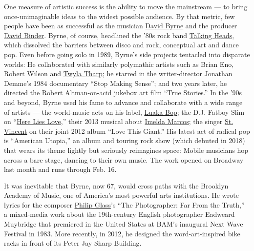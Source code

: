 One measure of artistic success is the ability to move the mainstream
--- to bring once-unimaginable ideas to the widest possible audience. By
that metric, few people have been as successful as the musician
\href{https://www.nytimes3xbfgragh.onion/topic/person/david-byrne}{David
Byrne} and the producer
\href{https://www.bam.org/about/leadership/david-binder}{David Binder}.
Byrne, of course, headlined the '80s rock band
\href{https://www.nytimes3xbfgragh.onion/topic/organization/the-talking-heads}{Talking
Heads}, which dissolved the barriers between disco and rock, conceptual
art and dance pop. Even before going solo in 1989, Byrne's side projects
tentacled into disparate worlds: He collaborated with similarly
polymathic artists such as Brian Eno, Robert Wilson and
\href{https://www.nytimes3xbfgragh.onion/topic/person/twyla-tharp}{Twyla
Tharp}; he starred in the writer-director Jonathan Demme's 1984
documentary ``Stop Making Sense''; and two years later, he directed the
Robert Altman-on-acid jukebox art film ``True Stories.'' In the '90s and
beyond, Byrne used his fame to advance and collaborate with a wide range
of artists --- the world-music acts on his label,
\href{https://luakabop.com/}{Luaka Bop}; the D.J. Fatboy Slim on
``\href{https://www.nytimes3xbfgragh.onion/2013/04/07/theater/david-byrnes-here-lies-love-about-imelda-marcos.html}{Here
Lies Love},'' their 2013 musical about
\href{https://www.nytimes3xbfgragh.onion/topic/person/imelda-r-marcos}{Imelda
Marcos}; the singer
\href{https://www.nytimes3xbfgragh.onion/2018/02/16/t-magazine/alex-da-corte-st-vincent.html}{St.
Vincent} on their joint 2012 album ``Love This Giant.'' His latest act
of radical pop is ``American Utopia,'' an album and touring rock show
(which debuted in 2018) that wears its theme lightly but seriously
reimagines space: Mobile musicians hop across a bare stage, dancing to
their own music. The work opened on Broadway last month and runs through
Feb. 16.

It was inevitable that Byrne, now 67, would cross paths with the
Brooklyn Academy of Music, one of America's most powerful arts
institutions. He wrote lyrics for the composer
\href{https://www.nytimes3xbfgragh.onion/topic/person/philip-glass}{Philip
Glass}'s ``The Photographer: Far From the Truth,'' a mixed-media work
about the 19th-century English photographer Eadweard Muybridge that
premiered in the United States at BAM's inaugural Next Wave Festival in
1983. More recently, in 2012, he designed the word-art-inspired bike
racks in front of its Peter Jay Sharp Building.

